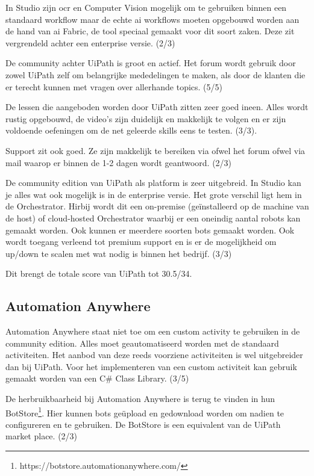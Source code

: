 In Studio zijn \acrshort{ocr} en Computer Vision mogelijk om te gebruiken binnen een standaard \gls{workflow} maar de echte \acrshort{ai} \gls{workflow}s moeten opgebouwd worden aan de hand van \acrshort{ai} Fabric, de tool speciaal gemaakt voor dit soort zaken. Deze zit vergrendeld achter een enterprise versie. (2/3)

De community achter UiPath is groot en actief. Het forum wordt gebruik door zowel UiPath zelf om belangrijke mededelingen te maken, als door de klanten die er terecht kunnen met vragen over allerhande topics. (5/5)

De lessen die aangeboden worden door UiPath zitten zeer goed ineen. Alles wordt rustig opgebouwd, de video's zijn duidelijk en makkelijk te volgen en er zijn voldoende oefeningen om de net geleerde skills eens te testen. (3/3).

Support zit ook goed. Ze zijn makkelijk te bereiken via ofwel het forum ofwel via mail waarop er binnen de 1-2 dagen wordt geantwoord. (2/3)

De community edition van UiPath als platform is zeer uitgebreid. In Studio kan je alles wat ook mogelijk is in de enterprise versie. Het grote verschil ligt hem in de Orchestrator. Hirbij wordt dit een on-premise (geïnstalleerd op de machine van de host) of cloud-hosted Orchestrator waarbij er een oneindig aantal robots kan gemaakt worden. Ook kunnen er meerdere soorten bots gemaakt worden. Ook wordt toegang verleend tot premium support en is er de mogelijkheid om up/down te scalen met wat nodig is binnen het bedrijf. (3/3)

Dit brengt de totale score van UiPath tot 30.5/34.

\subsection{Automation Anywhere}
Automation Anywhere staat niet toe om een custom activity te gebruiken in de community edition. Alles moet geautomatiseerd worden met de standaard \gls{activiteit}en. Het aanbod van deze reeds voorziene \gls{activiteit}en is wel uitgebreider dan bij UiPath. Voor het implementeren van een custom \gls{activiteit} kan gebruik gemaakt worden van een C\# Class Library. (3/5)

De herbruikbaarheid bij Automation Anywhere is terug te vinden in hun BotStore\footnote{https://botstore.automationanywhere.com/}. Hier kunnen bots geüpload en gedownload worden om nadien te configureren en te gebruiken. De BotStore is een equivalent van de UiPath market place. (2/3)

